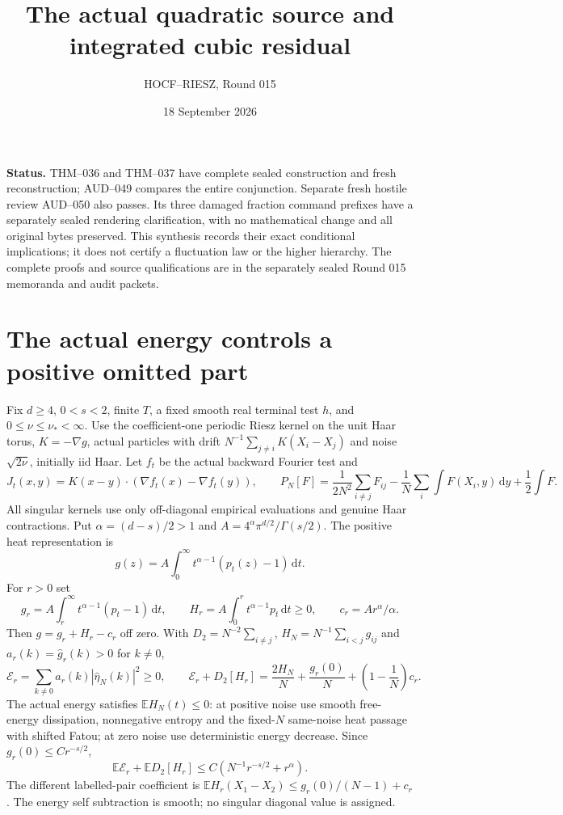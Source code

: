 \documentclass[10pt]{article}
\title{The actual quadratic source and integrated cubic residual}
\author{HOCF--RIESZ, Round 015}
\date{18 September 2026}
\newcommand{\E}{\mathbb E}
\newcommand{\dd}{\,\mathrm d}
\begin{document}
\maketitle
\noindent\textbf{Status.} THM--036 and THM--037 have complete sealed construction
and fresh reconstruction; AUD--049 compares the entire conjunction.
Separate fresh hostile review AUD--050 also passes. Its three damaged fraction
command prefixes have a separately sealed rendering clarification, with no
mathematical change and all original bytes preserved. This synthesis records their exact
conditional implications; it does not certify a fluctuation law or the higher
hierarchy. The complete proofs and source qualifications are in the separately
sealed Round 015 memoranda and audit packets.

\section*{The actual energy controls a positive omitted part}
Fix $d\ge4$, $0<s<2$, finite $T$, a fixed smooth real terminal test $h$,
and $0\le\nu\le\nu_*<\infty$. Use the coefficient-one periodic Riesz
kernel on the unit Haar torus, $K=-\nabla g$, actual particles with drift
$N^{-1}\sum_{j\ne i}K(X_i-X_j)$ and noise $\sqrt{2\nu}$, initially iid Haar.
Let $f_t$ be the actual backward Fourier test and
\[
 J_t(x,y)=K(x-y)\cdot(\nabla f_t(x)-\nabla f_t(y)),\qquad
 P_N[F]=\frac{1}{2N^2}\sum_{i\ne j}F_{ij}
 -\frac1N\sum_i\int F(X_i,y)\dd y+\frac12\int F.
\]
All singular kernels use only off-diagonal empirical evaluations and genuine
Haar contractions. Put $\alpha=(d-s)/2>1$ and
$A=4^\alpha\pi^{d/2}/\Gamma(s/2)$. The positive heat representation is
\[
 g(z)=A\int_0^\infty t^{\alpha-1}(p_t(z)-1)\dd t.
\]
For $r>0$ set
\[
 g_r=A\int_r^\infty t^{\alpha-1}(p_t-1)\dd t,\qquad
 H_r=A\int_0^r t^{\alpha-1}p_t\dd t\ge0,\qquad c_r=Ar^\alpha/\alpha.
\]
Then $g=g_r+H_r-c_r$ off zero. With $D_2=N^{-2}\sum_{i\ne j}$,
$H_N=N^{-1}\sum_{i<j}g_{ij}$ and $a_r(k)=\widehat g_r(k)>0$ for $k\ne0$,
\[
 \mathcal E_r=\sum_{k\ne0}a_r(k)|\widehat\eta_N(k)|^2\ge0,\qquad
 \mathcal E_r+D_2[H_r]
 =\frac{2H_N}{N}+\frac{g_r(0)}N+\left(1-\frac1N\right)c_r.
\]
The actual energy satisfies $\E H_N(t)\le0$: at positive noise use smooth
free-energy dissipation, nonnegative entropy and the fixed-$N$ same-noise
heat passage with shifted Fatou; at zero noise use deterministic energy decrease.
Since $g_r(0)\le Cr^{-s/2}$,
\[
 \E\mathcal E_r+\E D_2[H_r]\le C(N^{-1}r^{-s/2}+r^\alpha).
\]
The different labelled-pair coefficient is
$\E H_r(X_1-X_2)\le g_r(0)/(N-1)+c_r$.
The energy self subtraction is smooth; no singular diagonal value is assigned.
\end{document}
